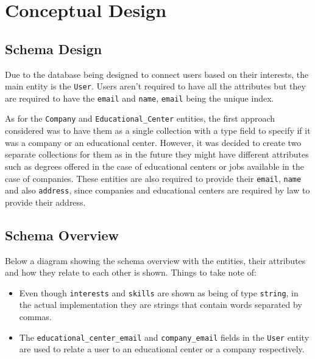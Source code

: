 \documentclass[english]{article}
\begin{document}


\section{Conceptual Design}

\subsection{Schema Design}

\par
Due to the database being designed to connect users based on their interests,
the main entity is the \texttt{User}. Users aren't required to have all the
attributes but they are required to have the \texttt{email} and \texttt{name},
\texttt{email} being the unique index.

\par
As for the \texttt{Company} and \texttt{Educational\_Center} entities, the first
approach considered was to have them as a single collection with a type field to
specify if it was a company or an educational center. However, it was decided to
create two separate collections for them as in the future they might have
different attributes such as degrees offered in the case of educational centers
or jobs available in the case of companies. These entities are also required to
provide their \texttt{email}, \texttt{name} and also \texttt{address}, since
companies and educational centers are required by law to provide their address.

\subsection{Schema Overview}

\par
Below a diagram showing the schema overview with the entities, their attributes
and how they relate to each other is shown. Things to take note of:

\begin{itemize}
	\item Even though \texttt{interests} and \texttt{skills} are shown as being of
	      type \texttt{string}, in the actual implementation they are strings that
	      contain words separated by commas.
	\item The \texttt{educational\_center\_email} and
	      \texttt{company\_email} fields in the \texttt{User} entity are used to
	      relate a user to an educational center or a company respectively.
\end{itemize}
\end{document}
